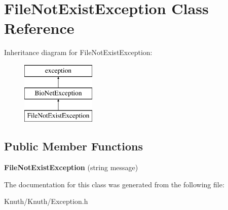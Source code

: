 \hypertarget{class_file_not_exist_exception}{}\section{File\+Not\+Exist\+Exception Class Reference}
\label{class_file_not_exist_exception}
Inheritance diagram for File\+Not\+Exist\+Exception\+:\begin{figure}[H]
\begin{center}
\leavevmode
\includegraphics[height=3.000000cm]{class_file_not_exist_exception}
\end{center}
\end{figure}
\subsection*{Public Member Functions}
\begin{DoxyCompactItemize}
\item 
\mbox{\label{class_file_not_exist_exception_ac7c9910c68ba73381f8e04ed1cc1c455}} 
{\bfseries File\+Not\+Exist\+Exception} (string message)
\end{DoxyCompactItemize}


The documentation for this class was generated from the following file\+:\begin{DoxyCompactItemize}
\item 
Knuth/\+Knuth/Exception.\+h\end{DoxyCompactItemize}
